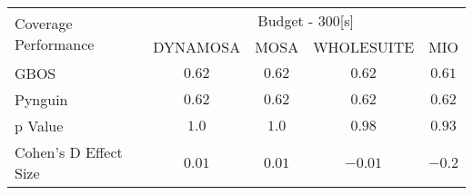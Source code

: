 \begin{tabular}{lcccc}\toprule 
\multirow{2}{*}{Coverage Performance} & \multicolumn{4}{c}{Budget - 300[s] } \\ \cmidrule(lr){2-5}  
                                      & DYNAMOSA&MOSA&WHOLESUITE&MIO                         \\ \midrule 
GBOS                                  & \(0.62\)&\(0.62\)&\(0.62\)&\(0.61\)                       \\ 
Pynguin                               & \(0.62\)&\(0.62\)&\(0.62\)&\(0.62\)                       \\ 
p Value                               & \(1.0\)&\(1.0\)&\(0.98\)&\(0.93\)                     \\ 
Cohen's D Effect Size                 & \(0.01\)&\(0.01\)&\(-0.01\)&\(-0.2\)                       \\ 
\bottomrule 
\end{tabular}